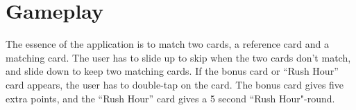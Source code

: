 \section{Gameplay}
The essence of the application is to match two cards, a reference card and a matching card. The user has to slide up to skip when the two cards don’t match, and slide down to keep two matching cards. If the bonus card or “Rush Hour” card appears, the user has to double-tap on the card. The bonus card gives five extra points, and the “Rush Hour” card gives a 5 second “Rush Hour"-round.